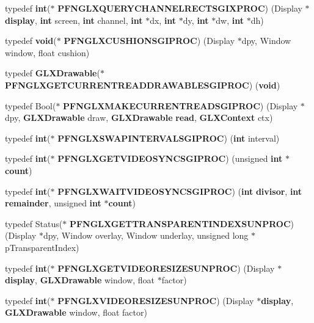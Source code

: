 \begin{DoxyCompactItemize}
\item 
typedef {\bf int}($\ast$ {\bf P\+F\+N\+G\+L\+X\+Q\+U\+E\+R\+Y\+C\+H\+A\+N\+N\+E\+L\+R\+E\+C\+T\+S\+G\+I\+X\+P\+R\+OC}) (Display $\ast${\bf display}, {\bf int} screen, {\bf int} channel, {\bf int} $\ast$dx, {\bf int} $\ast$dy, {\bf int} $\ast$dw, {\bf int} $\ast$dh)
\item 
typedef {\bf void}($\ast$ {\bf P\+F\+N\+G\+L\+X\+C\+U\+S\+H\+I\+O\+N\+S\+G\+I\+P\+R\+OC}) (Display $\ast$dpy, Window window, float cushion)
\item 
typedef {\bf G\+L\+X\+Drawable}($\ast$ {\bf P\+F\+N\+G\+L\+X\+G\+E\+T\+C\+U\+R\+R\+E\+N\+T\+R\+E\+A\+D\+D\+R\+A\+W\+A\+B\+L\+E\+S\+G\+I\+P\+R\+OC}) ({\bf void})
\item 
typedef Bool($\ast$ {\bf P\+F\+N\+G\+L\+X\+M\+A\+K\+E\+C\+U\+R\+R\+E\+N\+T\+R\+E\+A\+D\+S\+G\+I\+P\+R\+OC}) (Display $\ast$dpy, {\bf G\+L\+X\+Drawable} draw, {\bf G\+L\+X\+Drawable} {\bf read}, {\bf G\+L\+X\+Context} ctx)
\item 
typedef {\bf int}($\ast$ {\bf P\+F\+N\+G\+L\+X\+S\+W\+A\+P\+I\+N\+T\+E\+R\+V\+A\+L\+S\+G\+I\+P\+R\+OC}) ({\bf int} interval)
\item 
typedef {\bf int}($\ast$ {\bf P\+F\+N\+G\+L\+X\+G\+E\+T\+V\+I\+D\+E\+O\+S\+Y\+N\+C\+S\+G\+I\+P\+R\+OC}) (unsigned {\bf int} $\ast${\bf count})
\item 
typedef {\bf int}($\ast$ {\bf P\+F\+N\+G\+L\+X\+W\+A\+I\+T\+V\+I\+D\+E\+O\+S\+Y\+N\+C\+S\+G\+I\+P\+R\+OC}) ({\bf int} {\bf divisor}, {\bf int} {\bf remainder}, unsigned {\bf int} $\ast${\bf count})
\item 
typedef Status($\ast$ {\bf P\+F\+N\+G\+L\+X\+G\+E\+T\+T\+R\+A\+N\+S\+P\+A\+R\+E\+N\+T\+I\+N\+D\+E\+X\+S\+U\+N\+P\+R\+OC}) (Display $\ast$dpy, Window overlay, Window underlay, unsigned long $\ast$p\+Transparent\+Index)
\item 
typedef {\bf int}($\ast$ {\bf P\+F\+N\+G\+L\+X\+G\+E\+T\+V\+I\+D\+E\+O\+R\+E\+S\+I\+Z\+E\+S\+U\+N\+P\+R\+OC}) (Display $\ast${\bf display}, {\bf G\+L\+X\+Drawable} window, float $\ast$factor)
\item 
typedef {\bf int}($\ast$ {\bf P\+F\+N\+G\+L\+X\+V\+I\+D\+E\+O\+R\+E\+S\+I\+Z\+E\+S\+U\+N\+P\+R\+OC}) (Display $\ast${\bf display}, {\bf G\+L\+X\+Drawable} window, float factor)
\end{DoxyCompactItemize}

